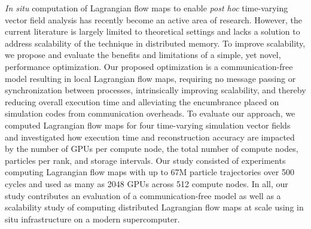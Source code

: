 \textit{In situ} computation of Lagrangian flow maps to enable \textit{post hoc} time-varying vector field analysis has recently become an active area of research. 
%
However, the current literature is largely limited to theoretical settings and lacks a solution to address scalability of the technique in distributed memory.
%
To improve scalability, we propose and evaluate the benefits and limitations of a simple, yet novel, performance optimization.
%
Our proposed optimization is a communication-free model resulting in local Lagrangian flow maps, requiring no message passing or synchronization between processes, intrinsically improving scalability, and thereby reducing overall execution time and alleviating the encumbrance placed on simulation codes from communication overheads.
%
To evaluate our approach, we computed Lagrangian flow maps for four time-varying simulation vector fields and investigated how execution time and reconstruction accuracy are impacted by the number of GPUs per compute node, the total number of compute nodes, particles per rank, and storage intervals. 
%
Our study consisted of experiments computing Lagrangian flow maps with up to 67M particle trajectories over 500 cycles and used as many as 2048 GPUs across 512 compute nodes.
%
In all, our study contributes an evaluation of a communication-free model as well as a scalability study of computing distributed Lagrangian flow maps at scale using in situ infrastructure on a modern supercomputer.
%
